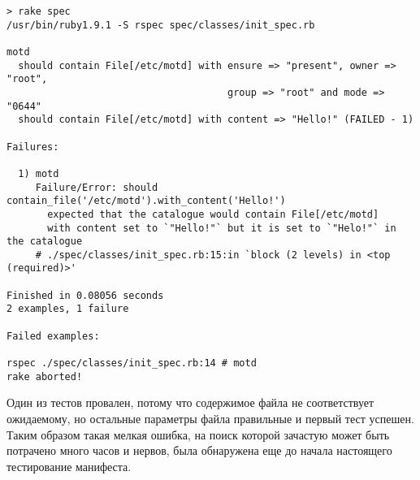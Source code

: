 \begin{verbatim}
> rake spec
/usr/bin/ruby1.9.1 -S rspec spec/classes/init_spec.rb

motd
  should contain File[/etc/motd] with ensure => "present", owner => "root",
                                      group => "root" and mode => "0644"
  should contain File[/etc/motd] with content => "Hello!" (FAILED - 1)

Failures:

  1) motd 
     Failure/Error: should contain_file('/etc/motd').with_content('Hello!')
       expected that the catalogue would contain File[/etc/motd]
       with content set to `"Hello!"` but it is set to `"Helo!"` in the catalogue
     # ./spec/classes/init_spec.rb:15:in `block (2 levels) in <top (required)>'

Finished in 0.08056 seconds
2 examples, 1 failure

Failed examples:

rspec ./spec/classes/init_spec.rb:14 # motd 
rake aborted!
\end{verbatim}

Один из тестов провален, потому что содержимое файла не соответствует ожидаемому, но остальные параметры файла правильные и первый тест успешен. Таким образом такая мелкая ошибка, на поиск которой зачастую может быть потрачено много часов и нервов, была обнаружена еще до начала настоящего тестирование манифеста.
